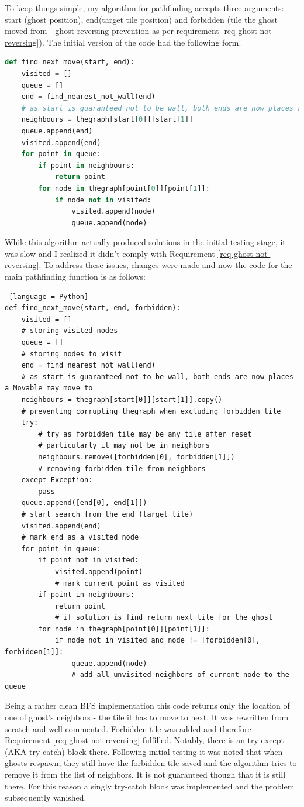 \documentclass[11pt,a4paper,notitlepage]{report}
\begin{document}
				To keep things simple, my algorithm for pathfinding accepts three arguments: start (ghost position), end(target tile position) and forbidden (tile the ghost moved from - ghost reversing prevention as per requirement \ref{req-ghost-not-reversing}).
				The initial version of the code had the following form.
				\begin{lstlisting}[language=Python]
def find_next_move(start, end):
	visited = []
	queue = []
	end = find_nearest_not_wall(end)
	# as start is guaranteed not to be wall, both ends are now places a Movable may move to
	neighbours = thegraph[start[0]][start[1]]
	queue.append(end)
	visited.append(end)
	for point in queue:
		if point in neighbours:
			return point
		for node in thegraph[point[0]][point[1]]:
			if node not in visited:
				visited.append(node)
				queue.append(node)
				\end{lstlisting}
				While this algorithm actually produced solutions in the initial testing stage, it was slow and I realized it didn't comply with Requirement \ref{req-ghost-not-reversing}. To address these issues, changes were made and now the code for the main pathfinding function is as follows:
				\begin{lstlisting} [language = Python]
def find_next_move(start, end, forbidden):
	visited = []
	# storing visited nodes
	queue = []
	# storing nodes to visit
	end = find_nearest_not_wall(end)
	# as start is guaranteed not to be wall, both ends are now places a Movable may move to
	neighbours = thegraph[start[0]][start[1]].copy()
	# preventing corrupting thegraph when excluding forbidden tile
	try:
		# try as forbidden tile may be any tile after reset
		# particularly it may not be in neighbors
		neighbours.remove([forbidden[0], forbidden[1]])
		# removing forbidden tile from neighbors
	except Exception:
		pass
	queue.append([end[0], end[1]])
	# start search from the end (target tile)
	visited.append(end)
	# mark end as a visited node
	for point in queue:
		if point not in visited:
			visited.append(point)
			# mark current point as visited
		if point in neighbours:
			return point
			# if solution is find return next tile for the ghost
		for node in thegraph[point[0]][point[1]]:
			if node not in visited and node != [forbidden[0], forbidden[1]]:
				queue.append(node)
				# add all unvisited neighbors of current node to the queue
				\end{lstlisting}
				Being a rather clean BFS implementation this code returns only the location of one of ghost's neighbors - the tile it has to move to next. It was rewritten from scratch and well commented. Forbidden tile was added and therefore Requirement \ref{req-ghost-not-reversing} fulfilled.
				Notably, there is an try-except (AKA try-catch) block there. Following initial testing it was noted that when ghosts respawn, they still have the forbidden tile saved and the algorithm tries to remove it from the list of neighbors. It is not guaranteed though that it is still there. For this reason a singly try-catch block was implemented and the problem subsequently vanished.
\end{document}
